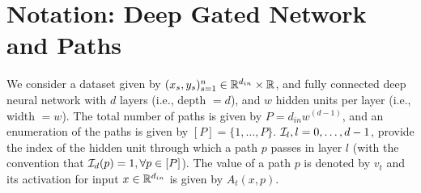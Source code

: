 \section{Notation: Deep Gated Network and Paths}\label{sec:pathgate}

\begin{table}[!htb]
\begin{minipage}{0.5\columnwidth}
\end{minipage}
\begin{minipage}{0.5\columnwidth}
\end{minipage}
\caption{Here $\Theta(l,i,j)$ denotes the weight connecting node $i$ of layer $l-1$ to node $j$ of layer $l$, and $\odot$ stands for the \emph{Hadamard} product.}
\label{tb:dgn-path}
\end{table}
We consider a dataset given by $(x_s,y_s)_{s=1}^n\in \mathbb{R}^{d_{in}}\times \mathbb{R}$, and fully connected deep neural network with $d$ layers (i.e., depth $=d$), and $w$ hidden units per layer (i.e., width $=w$). The total number of paths is given by $P=d_{in}w^{(d-1)}$, and an enumeration of the paths is given by $[P]=\{1,\ldots,P\}$.  $\mathcal{I}_{l},l=0,\ldots,d-1$, provide the index of the hidden unit through which a path $p$ passes in layer $l$ (with the convention that $\mathcal{I}_d(p)=1,\forall p\in [P]$). The value of a path $p$ is denoted by $v_t$ and its activation for input $x\in \mathbb{R}^{d_{in}}$ is given by $A_t(x,p)$. \hfill\\
